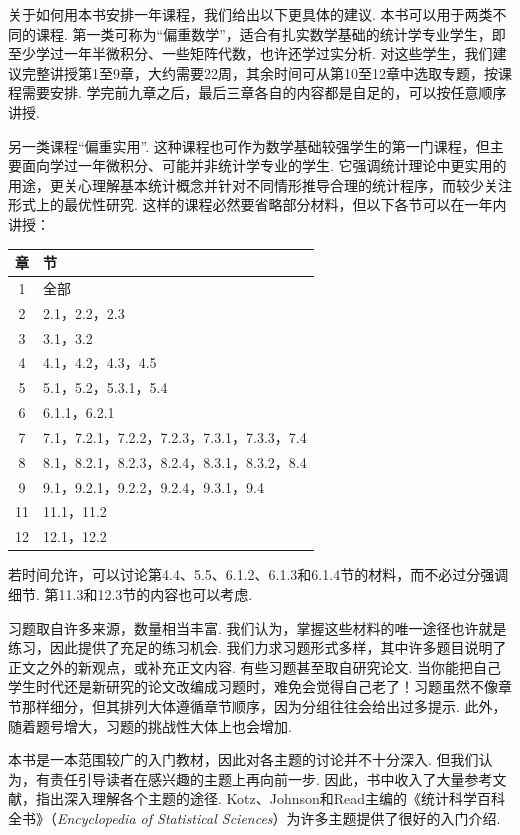 关于如何用本书安排一年课程，我们给出以下更具体的建议. 本书可以用于两类不同的课程. 第一类可称为“偏重数学”，适合有扎实数学基础的统计学专业学生，即至少学过一年半微积分、一些矩阵代数，也许还学过实分析. 对这些学生，我们建议完整讲授第1至9章，大约需要22周，其余时间可从第10至12章中选取专题，按课程需要安排. 学完前九章之后，最后三章各自的内容都是自足的，可以按任意顺序讲授.

另一类课程“偏重实用”. 这种课程也可作为数学基础较强学生的第一门课程，但主要面向学过一年微积分、可能并非统计学专业的学生. 它强调统计理论中更实用的用途，更关心理解基本统计概念并针对不同情形推导合理的统计程序，而较少关注形式上的最优性研究. 这样的课程必然要省略部分材料，但以下各节可以在一年内讲授：
\begin{center}\begin{tabular}{cl}
章 & 节\\\hline
1 & 全部\\
2 & 2.1，2.2，2.3\\
3 & 3.1，3.2\\
4 & 4.1，4.2，4.3，4.5\\
5 & 5.1，5.2，5.3.1，5.4\\
6 & 6.1.1，6.2.1\\
7 & 7.1，7.2.1，7.2.2，7.2.3，7.3.1，7.3.3，7.4\\
8 & 8.1，8.2.1，8.2.3，8.2.4，8.3.1，8.3.2，8.4\\
9 & 9.1，9.2.1，9.2.2，9.2.4，9.3.1，9.4\\
11 & 11.1，11.2\\
12 & 12.1，12.2
\end{tabular}\end{center}
若时间允许，可以讨论第4.4、5.5、6.1.2、6.1.3和6.1.4节的材料，而不必过分强调细节. 第11.3和12.3节的内容也可以考虑.

习题取自许多来源，数量相当丰富. 我们认为，掌握这些材料的唯一途径也许就是练习，因此提供了充足的练习机会. 我们力求习题形式多样，其中许多题目说明了正文之外的新观点，或补充正文内容. 有些习题甚至取自研究论文. 当你能把自己学生时代还是新研究的论文改编成习题时，难免会觉得自己老了！习题虽然不像章节那样细分，但其排列大体遵循章节顺序，因为分组往往会给出过多提示. 此外，随着题号增大，习题的挑战性大体上也会增加.

本书是一本范围较广的入门教材，因此对各主题的讨论并不十分深入. 但我们认为，有责任引导读者在感兴趣的主题上再向前一步. 因此，书中收入了大量参考文献，指出深入理解各个主题的途径. Kotz、Johnson和Read主编的《统计科学百科全书》（\textit{Encyclopedia of Statistical Sciences}）为许多主题提供了很好的入门介绍.

